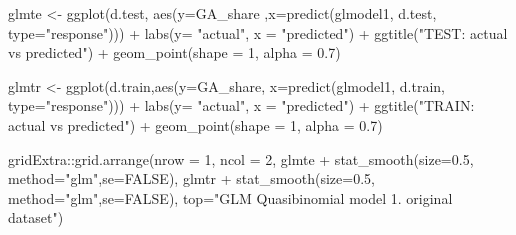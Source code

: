 \documentclass[
]{article}
\newenvironment{Shaded}{\begin{snugshade}}{\end{snugshade}}
\newcommand{\AttributeTok}[1]{\textcolor[rgb]{0.77,0.63,0.00}{#1}}
\newcommand{\ConstantTok}[1]{\textcolor[rgb]{0.00,0.00,0.00}{#1}}
\newcommand{\DecValTok}[1]{\textcolor[rgb]{0.00,0.00,0.81}{#1}}
\newcommand{\FloatTok}[1]{\textcolor[rgb]{0.00,0.00,0.81}{#1}}
\newcommand{\FunctionTok}[1]{\textcolor[rgb]{0.00,0.00,0.00}{#1}}
\newcommand{\NormalTok}[1]{#1}
\newcommand{\OtherTok}[1]{\textcolor[rgb]{0.56,0.35,0.01}{#1}}
\newcommand{\SpecialCharTok}[1]{\textcolor[rgb]{0.00,0.00,0.00}{#1}}
\newcommand{\StringTok}[1]{\textcolor[rgb]{0.31,0.60,0.02}{#1}}
\begin{document}
\begin{Shaded}
\begin{Highlighting}[]
\NormalTok{glmte }\OtherTok{\textless{}{-}} \FunctionTok{ggplot}\NormalTok{(d.test, }\FunctionTok{aes}\NormalTok{(}\AttributeTok{y=}\NormalTok{GA\_share ,}\AttributeTok{x=}\FunctionTok{predict}\NormalTok{(glmodel1, d.test, }\AttributeTok{type=}\StringTok{"response"}\NormalTok{))) }\SpecialCharTok{+}
  \FunctionTok{labs}\NormalTok{(}\AttributeTok{y=} \StringTok{"actual"}\NormalTok{, }\AttributeTok{x =} \StringTok{"predicted"}\NormalTok{) }\SpecialCharTok{+} \FunctionTok{ggtitle}\NormalTok{(}\StringTok{"TEST: actual vs predicted"}\NormalTok{) }\SpecialCharTok{+} 
  \FunctionTok{geom\_point}\NormalTok{(}\AttributeTok{shape =} \DecValTok{1}\NormalTok{, }\AttributeTok{alpha =} \FloatTok{0.7}\NormalTok{)}

\NormalTok{glmtr }\OtherTok{\textless{}{-}} \FunctionTok{ggplot}\NormalTok{(d.train,}\FunctionTok{aes}\NormalTok{(}\AttributeTok{y=}\NormalTok{GA\_share, }\AttributeTok{x=}\FunctionTok{predict}\NormalTok{(glmodel1, d.train, }\AttributeTok{type=}\StringTok{"response"}\NormalTok{))) }\SpecialCharTok{+}
  \FunctionTok{labs}\NormalTok{(}\AttributeTok{y=} \StringTok{"actual"}\NormalTok{, }\AttributeTok{x =} \StringTok{"predicted"}\NormalTok{) }\SpecialCharTok{+} \FunctionTok{ggtitle}\NormalTok{(}\StringTok{"TRAIN: actual vs predicted"}\NormalTok{) }\SpecialCharTok{+} 
  \FunctionTok{geom\_point}\NormalTok{(}\AttributeTok{shape =} \DecValTok{1}\NormalTok{, }\AttributeTok{alpha =} \FloatTok{0.7}\NormalTok{)}

\NormalTok{gridExtra}\SpecialCharTok{::}\FunctionTok{grid.arrange}\NormalTok{(}\AttributeTok{nrow =} \DecValTok{1}\NormalTok{, }\AttributeTok{ncol =} \DecValTok{2}\NormalTok{, }
\NormalTok{                        glmte }\SpecialCharTok{+} \FunctionTok{stat\_smooth}\NormalTok{(}\AttributeTok{size=}\FloatTok{0.5}\NormalTok{, }\AttributeTok{method=}\StringTok{"glm"}\NormalTok{,}\AttributeTok{se=}\ConstantTok{FALSE}\NormalTok{),}
\NormalTok{                        glmtr }\SpecialCharTok{+} \FunctionTok{stat\_smooth}\NormalTok{(}\AttributeTok{size=}\FloatTok{0.5}\NormalTok{, }\AttributeTok{method=}\StringTok{"glm"}\NormalTok{,}\AttributeTok{se=}\ConstantTok{FALSE}\NormalTok{),}
                        \AttributeTok{top=}\StringTok{"GLM Quasibinomial model 1. original dataset"}\NormalTok{)}
\end{Highlighting}
\end{Shaded}
\end{document}

